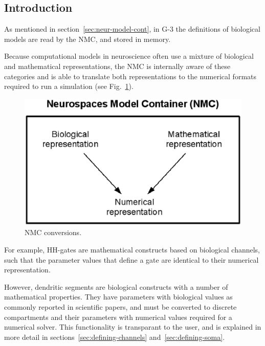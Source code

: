 \documentclass[12pt]{article}
\begin{document}
\subsection{Introduction}

As mentioned in section~\ref{sec:neur-model-cont}, in G-3 the
definitions of biological models are read by the NMC, and stored in
memory.

Because computational models in neuroscience often use a mixture of
biological and mathematical representations, the NMC is internally
aware of these categories and is able to translate both
representations to the numerical formats required to run a simulation
(see Fig.~\ref{fig:nmc-conversions}).

\begin{figure}[h]
  \centering
  \includegraphics{figures/conversions.eps}
  \caption{NMC conversions.}
  \label{fig:nmc-conversions}
\end{figure}

For example, HH-gates are mathematical constructs based on biological
channels, such that the parameter values that define a gate are
identical to their numerical representation.

However, dendritic segments are biological constructs with a number of
mathematical properties.  They have parameters with biological values
as commonly reported in scientific papers, and must be converted to
discrete compartments and their parameters with numerical values
required for a numerical solver.  This functionality is transparant to
the user, and is explained in more detail in
sections~\ref{sec:defining-channels} and~\ref{sec:defining-soma}.
\end{document}
